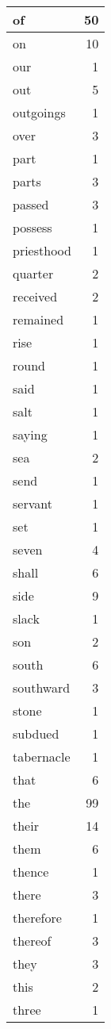 \begin{center}
\begin{longtable}{l|r}
of & 50\\ \hline 
on & 10\\ \hline 
our & 1\\ \hline 
out & 5\\ \hline 
outgoings & 1\\ \hline 
over & 3\\ \hline 
part & 1\\ \hline 
parts & 3\\ \hline 
passed & 3\\ \hline 
possess & 1\\ \hline 
priesthood & 1\\ \hline 
quarter & 2\\ \hline 
received & 2\\ \hline 
remained & 1\\ \hline 
rise & 1\\ \hline 
round & 1\\ \hline 
said & 1\\ \hline 
salt & 1\\ \hline 
saying & 1\\ \hline 
sea & 2\\ \hline 
send & 1\\ \hline 
servant & 1\\ \hline 
set & 1\\ \hline 
seven & 4\\ \hline 
shall & 6\\ \hline 
side & 9\\ \hline 
slack & 1\\ \hline 
son & 2\\ \hline 
south & 6\\ \hline 
southward & 3\\ \hline 
stone & 1\\ \hline 
subdued & 1\\ \hline 
tabernacle & 1\\ \hline 
that & 6\\ \hline 
the & 99\\ \hline 
their & 14\\ \hline 
them & 6\\ \hline 
thence & 1\\ \hline 
there & 3\\ \hline 
therefore & 1\\ \hline 
thereof & 3\\ \hline 
they & 3\\ \hline 
this & 2\\ \hline 
three & 1\\ \hline 

\end{longtable}
\end{center}

